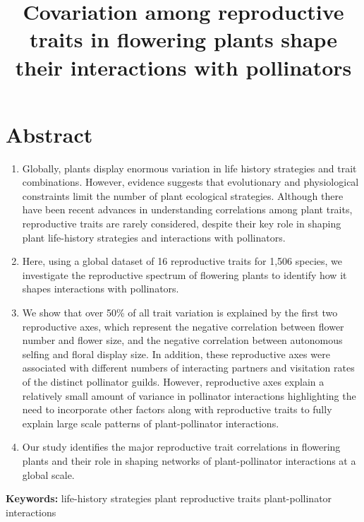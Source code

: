 \documentclass[
  12pt,
  a4paper,
]{article}
\title{\singlespacing \vspace{-1.6cm} \LARGE Covariation among reproductive traits in flowering plants shape their interactions with pollinators}
\author{}
\date{\vspace{-2.5em}}
\begin{document}
\maketitle

\doublespacing
\normalsize

\hypertarget{abstract}{%
\section{Abstract}\label{abstract}}

\begin{enumerate}
\def\labelenumi{\arabic{enumi}.}
\item
  Globally, plants display enormous variation in life history strategies and trait combinations. However, evidence suggests that evolutionary and physiological constraints limit the number of plant ecological strategies. Although there have been recent advances in understanding correlations among plant traits, reproductive traits are rarely considered, despite their key role in shaping plant life-history strategies and interactions with pollinators.
\item
  Here, using a global dataset of 16 reproductive traits for 1,506 species, we investigate the reproductive spectrum of flowering plants to identify how it shapes interactions with pollinators.
\item
  We show that over 50\% of all trait variation is explained by the first two reproductive axes, which represent the negative correlation between flower number and flower size, and the negative correlation between autonomous selfing and floral display size. In addition, these reproductive axes were associated with different numbers of interacting partners and visitation rates of the distinct pollinator guilds. However, reproductive axes explain a relatively small amount of variance in pollinator interactions highlighting the need to incorporate other factors along with reproductive traits to fully explain large scale patterns of plant-pollinator interactions.
\item
  Our study identifies the major reproductive trait correlations in flowering plants and their role in shaping networks of plant-pollinator interactions at a global scale.
\end{enumerate}

\textbf{Keywords:} life-history strategies \textbar{} plant reproductive traits \textbar{} plant-pollinator interactions

\doublespacing
\vspace{5mm}
\normalsize
\end{document}
